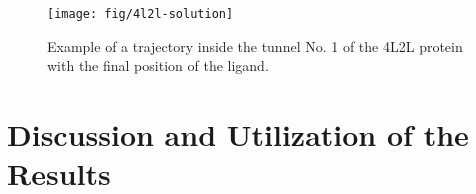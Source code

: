 \documentclass[usletter, 10pt, conference]{ieeeconf} %
\def\qrand{q_{rand}}
\def\smin{s_{min}}
\def\RA{A$_{1}$}
\def\RB{A$_{2}$}
\def\RC{A$_{1}^{*}$}
\begin{document}

\begin{figure}
\centering
\vskip -5pt
\texttt{[image: fig/4l2l-solution]}
\caption{\small
    \label{fig::inhibitor}Example of a trajectory inside the tunnel No. 1 of the 4L2L protein with the final position of the ligand.
}
\end{figure}



\section{Discussion and Utilization of the Results}

\end{document}
